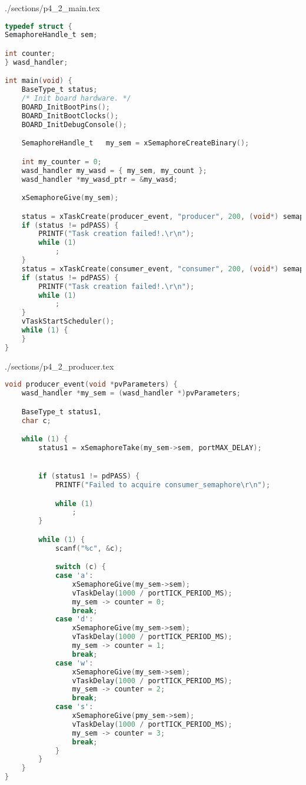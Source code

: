 \begin{filecontents}[overwrite]{./sections/p4_2_main.tex}
\begin{lstlisting}[language=c,caption=Problem 4.2 main, label=list:p4_2_main]
typedef struct {
SemaphoreHandle_t sem;

int counter;
} wasd_handler;

int main(void) {
    BaseType_t status;
    /* Init board hardware. */
    BOARD_InitBootPins();
    BOARD_InitBootClocks();
    BOARD_InitDebugConsole();

    SemaphoreHandle_t	my_sem = xSemaphoreCreateBinary();

    int my_counter = 0;
    wasd_handler my_wasd = { my_sem, my_count };
    wasd_handler *my_wasd_ptr = &my_wasd;

    xSemaphoreGive(my_sem);

    status = xTaskCreate(producer_event, "producer", 200, (void*) semaphores, 2, NULL);
    if (status != pdPASS) {
        PRINTF("Task creation failed!.\r\n");
        while (1)
            ;
    }
    status = xTaskCreate(consumer_event, "consumer", 200, (void*) semaphores, 2, NULL);
    if (status != pdPASS) {
        PRINTF("Task creation failed!.\r\n");
        while (1)
            ;
    }
    vTaskStartScheduler();
    while (1) {
    }
}        
\end{lstlisting}
\end{filecontents}

\begin{filecontents}[overwrite]{./sections/p4_2_producer.tex}
\begin{lstlisting}[language=c,caption=Problem 4.2 Producer Task, label=list:p4_2_prod]
void producer_event(void *pvParameters) {
    wasd_handler *my_sem = (wasd_handler *)pvParameters;

    BaseType_t status1,
    char c;

    while (1) {
        status1 = xSemaphoreTake(my_sem->sem, portMAX_DELAY);


        if (status1 != pdPASS) {
            PRINTF("Failed to acquire consumer_semaphore\r\n");

            while (1)
                ;
        }

        while (1) {
            scanf("%c", &c);

            switch (c) {
            case 'a':
                xSemaphoreGive(my_sem->sem);
                vTaskDelay(1000 / portTICK_PERIOD_MS);
                my_sem -> counter = 0;
                break;
            case 'd':
                xSemaphoreGive(my_sem->sem);
                vTaskDelay(1000 / portTICK_PERIOD_MS);
                my_sem -> counter = 1;
                break;
            case 'w':
                xSemaphoreGive(my_sem->sem);
                vTaskDelay(1000 / portTICK_PERIOD_MS);
                my_sem -> counter = 2;
                break;
            case 's':
                xSemaphoreGive(pmy_sem->sem);
                vTaskDelay(1000 / portTICK_PERIOD_MS);
                my_sem -> counter = 3;
                break;
            }
        }
    }
}
\end{lstlisting}
\end{filecontents}

